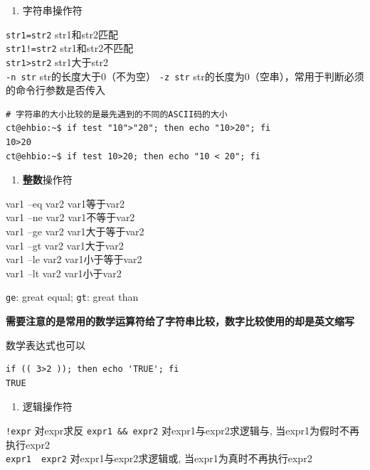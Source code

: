 \documentclass[]{article}
\providecommand{\tightlist}{%
  \setlength{\itemsep}{0pt}\setlength{\parskip}{0pt}}
\numberwithin{figure}{section}
\numberwithin{table}{section}
\begin{document}
\begin{enumerate}
\def\labelenumi{\arabic{enumi}.}
\setcounter{enumi}{1}
\tightlist
\item
  字符串操作符
\end{enumerate}

\texttt{str1=str2} str1和str2匹配\\
\texttt{str1!=str2} str1和str2不匹配\\
\texttt{str1\textgreater{}str2} str1大于str2\\
\texttt{-n\ str} str的长度大于0（不为空）
\texttt{-z\ str} str的长度为0（空串），常用于判断必须的命令行参数是否传入

\begin{verbatim}
# 字符串的大小比较的是最先遇到的不同的ASCII码的大小
ct@ehbio:~$ if test "10">"20"; then echo "10>20"; fi
10>20
ct@ehbio:~$ if test 10>20; then echo "10 < 20"; fi
\end{verbatim}

\begin{enumerate}
\def\labelenumi{\arabic{enumi}.}
\setcounter{enumi}{2}
\tightlist
\item
  \textbf{整数}操作符
\end{enumerate}

var1 --eq var2 var1等于var2\\
var1 --ne var2 var1不等于var2\\
var1 --ge var2 var1大于等于var2\\
var1 --gt var2 var1大于var2\\
var1 --le var2 var1小于等于var2\\
var1 --lt var2 var1小于var2

\texttt{ge}: great equal; \texttt{gt}: great than

\textbf{需要注意的是常用的数学运算符给了字符串比较，数字比较使用的却是英文缩写}

数学表达式也可以

\begin{verbatim}
if (( 3>2 )); then echo 'TRUE'; fi
TRUE
\end{verbatim}

\begin{enumerate}
\def\labelenumi{\arabic{enumi}.}
\setcounter{enumi}{3}
\tightlist
\item
  逻辑操作符
\end{enumerate}

\texttt{!expr} 对expr求反
\texttt{expr1\ \&\&\ expr2} 对expr1与expr2求逻辑与, 当expr1为假时不再执行expr2\\
\texttt{expr1\ \textbar{}\textbar{}\ expr2} 对expr1与expr2求逻辑或, 当expr1为真时不再执行expr2
\end{document}
